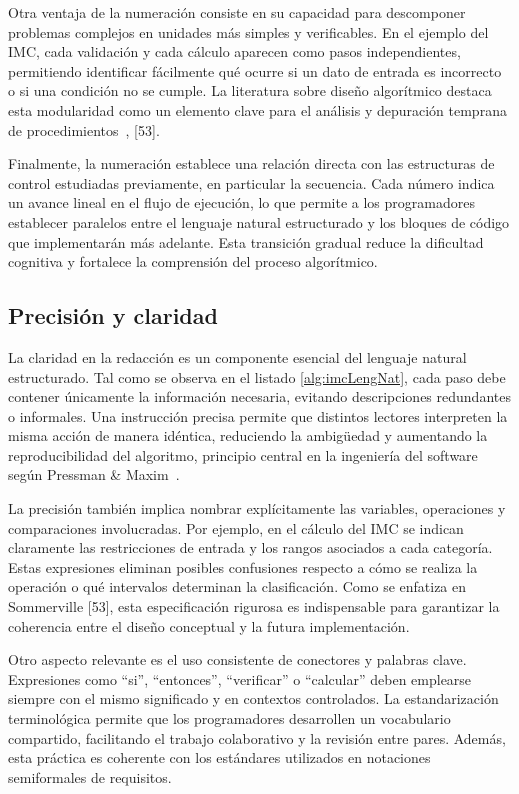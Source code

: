 \documentclass[12pt,twoside]{book}
\begin{document}
					Otra ventaja de la numeración consiste en su capacidad para descomponer problemas complejos en unidades más simples y verificables. En el ejemplo del IMC, cada validación y cada cálculo aparecen como pasos independientes, permitiendo identificar fácilmente qué ocurre si un dato de entrada es incorrecto o si una condición no se cumple. La literatura sobre diseño algorítmico destaca esta modularidad como un elemento clave para el análisis y depuración temprana de procedimientos~\cite{Pressman2019Software}, [53].
					
					Finalmente, la numeración establece una relación directa con las estructuras de control estudiadas previamente, en particular la secuencia. Cada número indica un avance lineal en el flujo de ejecución, lo que permite a los programadores establecer paralelos entre el lenguaje natural estructurado y los bloques de código que implementarán más adelante. Esta transición gradual reduce la dificultad cognitiva y fortalece la comprensión del proceso algorítmico.
					
				\subsection{Precisión y claridad}
					La claridad en la redacción es un componente esencial del lenguaje natural estructurado. Tal como se observa en el listado \ref{alg:imcLengNat}, cada paso debe contener únicamente la información necesaria, evitando descripciones redundantes o informales. Una instrucción precisa permite que distintos lectores interpreten la misma acción de manera idéntica, reduciendo la ambigüedad y aumentando la reproducibilidad del algoritmo, principio central en la ingeniería del software según Pressman \& Maxim~\cite{Pressman2019Software}.
					
					La precisión también implica nombrar explícitamente las variables, operaciones y comparaciones involucradas. Por ejemplo, en el cálculo del IMC se indican claramente las restricciones de entrada y los rangos asociados a cada categoría. Estas expresiones eliminan posibles confusiones respecto a cómo se realiza la operación o qué intervalos determinan la clasificación. Como se enfatiza en Sommerville [53], esta especificación rigurosa es indispensable para garantizar la coherencia entre el diseño conceptual y la futura implementación.
					
					Otro aspecto relevante es el uso consistente de conectores y palabras clave. Expresiones como “si”, “entonces”, “verificar” o “calcular” deben emplearse siempre con el mismo significado y en contextos controlados. La estandarización terminológica permite que los programadores desarrollen un vocabulario compartido, facilitando el trabajo colaborativo y la revisión entre pares. Además, esta práctica es coherente con los estándares utilizados en notaciones semiformales de requisitos.
					
\end{document}
